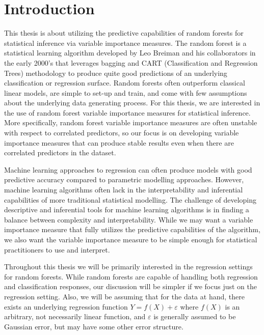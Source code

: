 \documentclass[12pt,twoside]{reedthesis}
\theoremstyle{definition}
\theoremstyle{definition}
\theoremstyle{definition}
\theoremstyle{remark}
\begin{document}
\mainmatter %
\pagestyle{fancyplain} %

\chapter*{Introduction}\label{introduction}

This thesis is about utilizing the predictive capabilities of random
forests for statistical inference via variable importance measures. The
random forest is a statistical learning algorithm developed by Leo
Breiman and his collaborators in the early 2000's that leverages bagging
and CART (Classification and Regression Trees) methodology to produce
quite good predictions of an underlying classification or regression
surface. Random forests often outperform classical linear models, are
simple to set-up and train, and come with few assumptions about the
underlying data generating process. For this thesis, we are interested
in the use of random forest variable importance measures for statistical
inference. More specifically, random forest variable importance measures
are often unstable with respect to correlated predictors, so our focus
is on developing variable importance measures that can produce stable
results even when there are correlated predictors in the dataset. \par

Machine learning approaches to regression can often produce models with
good predictive accuracy compared to parametric modelling approaches.
However, machine learning algorithms often lack in the interpretability
and inferential capabilities of more traditional statistical modelling.
The challenge of developing descriptive and inferential tools for
machine learning algorithms is in finding a balance between complexity
and interpretability. While we may want a variable importance measure
that fully utilizes the predictive capabilities of the algorithm, we
also want the variable importance measure to be simple enough for
statistical practitioners to use and interpret. \par

Throughout this thesis we will be primarily interested in the regression
settings for random forests. While random forests are capable of
handling both regression and classification responses, our discussion
will be simpler if we focus just on the regression setting. Also, we
will be assuming that for the data at hand, there exists an underlying
regression function \(Y=f(X)+\varepsilon\) where \(f(X)\) is an
arbitrary, not necessarily linear function, and \(\varepsilon\) is
generally assumed to be Gaussian error, but may have some other error
structure. \par
\end{document}
